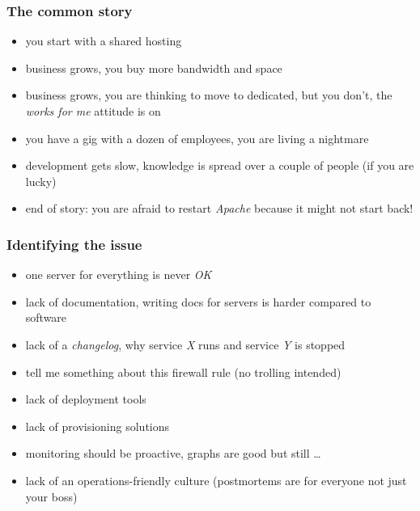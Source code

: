 \documentclass[compress]{beamer}
\begin{document}
\begin{frame}
\frametitle{The common story}

\begin{itemize}[<+->]
  \item you start with a shared hosting
  \item business grows, you buy more bandwidth and space
  \item business grows, you are thinking to move to dedicated, but you don't, the \emph{works for me} attitude is on
  \item you have a gig with a dozen of employees, you are living a nightmare
  \item development gets slow, knowledge is spread over a couple of people (if you are lucky)
  \item end of story: you are afraid to restart \emph{Apache} because it might not start back!
\end{itemize}
\end{frame}

\begin{frame}
\frametitle{Identifying the issue}

\begin{itemize}[<+->]
  \item one server for everything is never \emph{OK}
  \item lack of documentation, writing docs for servers is harder compared to software
  \item lack of a \emph{changelog}, why service \emph{X} runs and service \emph{Y} is stopped
  \item tell me something about this firewall rule (no trolling intended)
  \item lack of deployment tools
  \item lack of provisioning solutions
  \item monitoring should be proactive, graphs are good but still \ldots
  \item lack of an operations-friendly culture (postmortems are for everyone not just your boss)
\end{itemize}
\end{frame}
\end{document}

